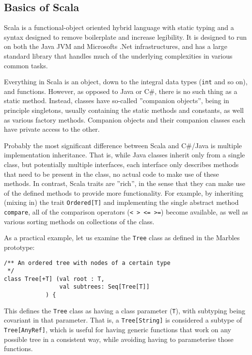 
\subsection{Basics of Scala}

Scala is a functional-object oriented hybrid language with static typing
and a syntax designed to remove boilerplate and increase legibility. It is
designed to run on both the Java JVM and Microsofts .Net infrastructures,
and has a large standard library that handles much of the underlying
complexities in various common tasks. 

Everything in Scala is an object, down to the integral data types
(\texttt{int} and so on), and functions. However, as opposed to Java or C\#,
there is no such thing as a static method. Instead, classes have so-called
''companion objects'', being in principle singletons, usually containing
the static methods and constants, as well as various factory methods.
Companion objects and their companion classes each have private access to
the other.

Probably the most significant difference between Scala and C\#/Java is
multiple implementation inheritance. That is, while Java classes inherit
only from a single class, but potentially multiple interfaces, each
interface only describes methods that need to be present in the class, no
actual code to make use of these methods. In contrast, Scala traits are
''rich'', in the sense that they can make use of the defined methods to
provide more functionality. For example, by inheriting (mixing in) the
trait \texttt{Ordered[T]} and implementing the single abstract method
\texttt{compare}, all of the comparison operators (\texttt{< > <= >=})
become available, as well as various sorting methods on collections of the
class.

As a practical example, let us examine the \texttt{Tree} class as defined
in the Marbles prototype:

\begin{verbatim}
/** An ordered tree with nodes of a certain type
 */
class Tree[+T] (val root : T, 
                val subtrees: Seq[Tree[T]]
            ) { 
\end{verbatim}

This defines the \texttt{Tree} class as having a class parameter
(\texttt{T}), with subtyping being covariant in that parameter. That is, a
\texttt{Tree[String]} is considered a subtype of \texttt{Tree[AnyRef]},
which is useful for having generic functions that work on any possible tree
in a consistent way, while avoiding having to parameterise those functions.

